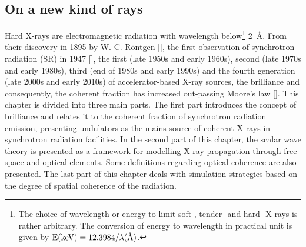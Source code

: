 
\begin{refsection}

\chapter{On a new kind of rays}\label{sec:x-rays}


Hard X-rays are electromagnetic radiation with wavelength below\footnote{The choice of wavelength or energy to limit soft-, tender- and hard- X-rays is rather arbitrary. The conversion of energy to wavelength in practical unit is given by $\text{E}(\text{keV})=12.3984/\lambda(\text{\r{A}})$.} 2~\r{A}. From their discovery in 1895 by W. C. R\"{o}ntgen [\cite{Roentgen1896}], the first observation of synchrotron radiation (SR) in 1947 [\cite{Elder1947}], the first (late 1950s and early 1960s), second (late 1970s and early 1980s), third (end of 1980s and early 1990s) and the fourth generation (late 2000s and early 2010s) of accelerator-based X-ray sources, the brilliance and consequently, the coherent fraction has increased out-passing Moore's law [\cite{Robinson2015}]. This chapter is divided into three main parts. The first part introduces the concept of brilliance and relates it to the coherent fraction of synchrotron radiation emission, presenting undulators as the mains source of coherent X-rays in synchrotron radiation facilities. In the second part of this chapter, the scalar wave theory is presented as a framework for modelling X-ray propagation through free-space and optical elements. Some definitions regarding optical coherence are also presented. The last part of this chapter deals with simulation strategies based on the degree of spatial coherence of the radiation.

\end{refsection}
